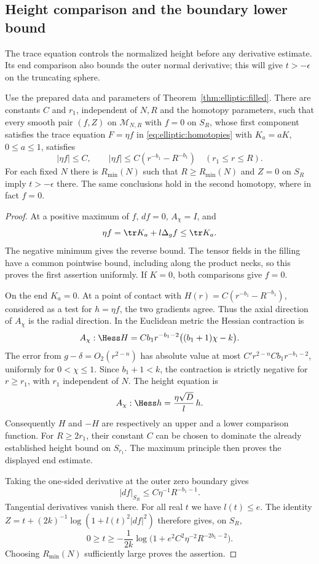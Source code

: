 \subsection{Height comparison and the boundary lower bound}

The trace equation controls the normalized height before any derivative
estimate.  Its end comparison also bounds the outer normal derivative;
this will give $t>-\epsilon$ on the truncating sphere.

\begin{lemma}\label{lem:elliptic:height}
Use the prepared data and parameters of Theorem~\ref{thm:elliptic:filled}.
There are constants $C$ and $r_1$, independent of $N,R$ and the homotopy
parameters, such that every smooth pair $(f,Z)$ on $\mathcal M_{N,R}$
with $f=0$ on $S_R$, whose first component satisfies the trace equation
$F=\eta f$ in \eqref{eq:elliptic:homotopies} with $K_a=aK$,
$0\le a\le1$, satisfies
\[
 |\eta f|\le C,\qquad
 |\eta f|\le C(r^{-b_1}-R^{-b_1})\quad(r_1\le r\le R).
\]
For each fixed $N$ there is $R_{\min}(N)$ such that $R\ge R_{\min}(N)$
and $Z=0$ on $S_R$ imply $t>-\epsilon$ there.  The same conclusions
hold in the second homotopy, where in fact $f=0$.
\end{lemma}

\begin{proof}
At a positive maximum of $f$, $df=0$, $A_\chi=I$, and
\[
 \eta f=\tr K_a+l\Delta_g f\le \tr K_a.
\]
The negative minimum gives the reverse bound.  The tensor fields in
the filling have a common pointwise bound, including along the product
necks, so this proves the first assertion uniformly.  If $K=0$, both
comparisons give $f=0$.

On the end $K_a=0$.  At a point of contact with
$H(r)=C(r^{-b_1}-R^{-b_1})$, considered as a test for $h=\eta f$, the
two gradients agree.  Thus the axial direction of $A_\chi$ is the
radial direction.  In the Euclidean metric the Hessian contraction is
\[
 A_\chi:\Hess H
 =Cb_1r^{-b_1-2}\big((b_1+1)\chi-k\big).
\]
The error from $g-\delta=O_2(r^{2-n})$ has absolute value at most
$C' r^{2-n}Cb_1r^{-b_1-2}$, uniformly for $0<\chi\le1$.
Since $b_1+1<k$, the contraction is strictly negative for $r\ge r_1$,
with $r_1$ independent of $N$.  The height equation is
\[
 A_\chi:\Hess h
   =\frac{\eta\sqrt D}{l}\,h.
\]
Consequently $H$ and $-H$ are respectively an upper and a lower
comparison function.  For $R\ge2r_1$, their constant $C$ can be chosen
to dominate the already established height bound on $S_{r_1}$.
The maximum principle then proves the displayed end estimate.

Taking the one-sided derivative at the outer zero boundary gives
\begin{equation}\label{eq:elliptic:outer-gradient}
 |df|_{S_R}\le C\eta^{-1}R^{-b_1-1}.
\end{equation}
Tangential derivatives vanish there.  For all real $t$ we have $l(t)\le e$.
The identity $Z=t+(2k)^{-1}\log(1+l(t)^2|df|^2)$ therefore gives, on
$S_R$,
\[
 0\ge t\ge-\frac1{2k}
       \log\bigl(1+e^2C^2\eta^{-2}R^{-2b_1-2}\bigr).
\]
Choosing $R_{\min}(N)$ sufficiently large proves the assertion.
\end{proof}


